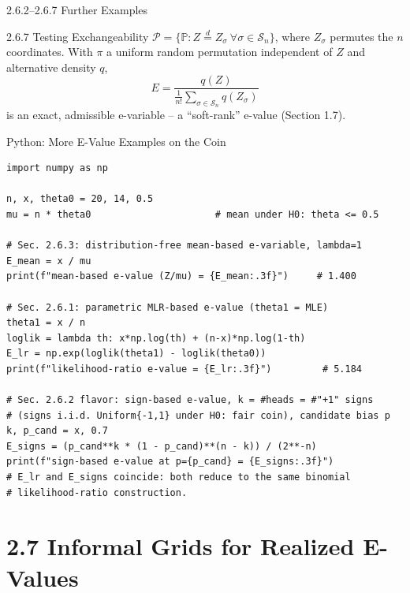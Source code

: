 \documentclass[aspectratio=169,10pt]{beamer}
\newcommand{\PP}{\mathbb{P}}
\newcommand{\calP}{\mathcal{P}}
\begin{document}
\begin{frame}[allowframebreaks]{2.6.2--2.6.7 Further Examples}
  \begin{block}{2.6.7 Testing Exchangeability}
    $\calP=\{\PP: Z\stackrel{d}{=}Z_\sigma\ \forall\sigma\in\mathcal{S}_n\}$,
    where $Z_\sigma$ permutes the $n$ coordinates. With $\pi$ a uniform
    random permutation independent of $Z$ and alternative density $q$,
    \[
      E = \frac{q(Z)}{\frac{1}{n!}\sum_{\sigma\in\mathcal{S}_n} q(Z_\sigma)}
    \]
    is an exact, admissible e-variable -- a ``soft-rank'' e-value (Section 1.7).
  \end{block}

\end{frame}

\begin{frame}[fragile]{Python: More E-Value Examples on the Coin}
\begin{lstlisting}[style=pycode]
import numpy as np

n, x, theta0 = 20, 14, 0.5
mu = n * theta0                      # mean under H0: theta <= 0.5

# Sec. 2.6.3: distribution-free mean-based e-variable, lambda=1
E_mean = x / mu
print(f"mean-based e-value (Z/mu) = {E_mean:.3f}")     # 1.400

# Sec. 2.6.1: parametric MLR-based e-value (theta1 = MLE)
theta1 = x / n
loglik = lambda th: x*np.log(th) + (n-x)*np.log(1-th)
E_lr = np.exp(loglik(theta1) - loglik(theta0))
print(f"likelihood-ratio e-value = {E_lr:.3f}")         # 5.184

# Sec. 2.6.2 flavor: sign-based e-value, k = #heads = #"+1" signs
# (signs i.i.d. Uniform{-1,1} under H0: fair coin), candidate bias p
k, p_cand = x, 0.7
E_signs = (p_cand**k * (1 - p_cand)**(n - k)) / (2**-n)
print(f"sign-based e-value at p={p_cand} = {E_signs:.3f}")
# E_lr and E_signs coincide: both reduce to the same binomial
# likelihood-ratio construction.
\end{lstlisting}
\end{frame}

\section{2.7 Informal Grids for Realized E-Values}
\end{document}
